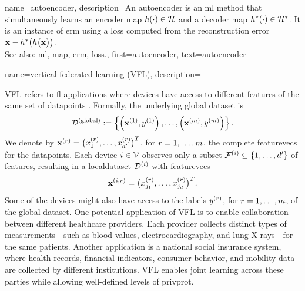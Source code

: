 {name={autoencoder},
	description={An autoencoder is an \gls{ml} method that simultaneously learns an encoder \gls{map} 
		$h(\cdot) \in \mathcal{H}$ and a decoder \gls{map} $h^{*}(\cdot) \in \mathcal{H}^{*}$. 
		It is an instance of \gls{erm} using a \gls{loss} computed from the reconstruction error 
		${\bf x} - h^{*}\big(  h \big( {\bf x} \big) \big)$.
					\\ 
		See also: \gls{ml}, \gls{map}, \gls{erm}, \gls{loss}.},
	first={autoencoder},
	text={autoencoder}
} 

{name={vertical federated learning (VFL)},
	description={
		VFL refers to \gls{fl} applications where  
		\glspl{device} have access to different \glspl{feature} of the same set of \glspl{datapoint} \cite{VFLChapter}. 
		Formally, the underlying global \gls{dataset} is
		\[
		\mathcal{D}^{(\mathrm{global})} := \left\{ \left({\bf x}^{(1)}, y^{(1)}\right), \ldots, \left({\bf x}^{(m)}, y^{(m)}\right) \right\}.
		\]
		We denote by ${\bf x}^{(r)} = \big( x^{(r)}_{1}, \ldots, x^{(r)}_{d'} \big)^{T}$, for $r=1,\ldots,m$, 
	     	the complete \glspl{featurevec} for the \glspl{datapoint}. Each \gls{device} $i \in \mathcal{V}$ 
		observes only a subset $\mathcal{F}^{(i)} \subseteq \{1,\ldots,d'\}$ of \glspl{feature}, resulting 
		in a \gls{localdataset} $\mathcal{D}^{(i)}$ with \glspl{featurevec}
		\[
		{\bf x}^{(i,r)} = \big( x^{(r)}_{j_{1}}, \ldots, x^{(r)}_{j_{d}} \big)^{T}.
		\]
		Some of the \glspl{device} might also have access to the \glspl{label} $y^{(r)}$, for $r=1,\ldots,m$, 
		of the global \gls{dataset}. One potential application of VFL is to enable collaboration between 
		different healthcare providers. Each provider collects distinct types of measurements—such as blood 
		values, electrocardiography, and lung X-rays—for the same patients. Another application is a 
		national social insurance system, where health records, financial indicators, consumer behavior, 
		and mobility \gls{data} are collected by different institutions. VFL enables joint learning across 
		these parties while allowing well-defined levels of \gls{privprot}.
		\begin{figure}[H]
			\begin{center}

\end{center}
\end{figure}}}
